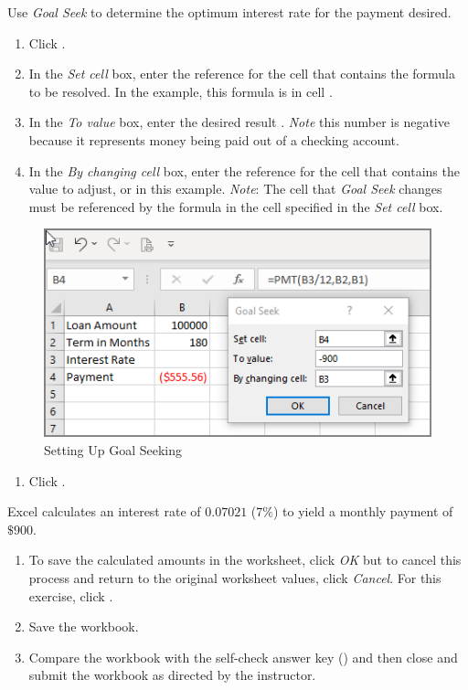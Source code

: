 Use \textit{Goal Seek} to determine the optimum interest rate for the payment desired.

\begin{enumerate}
	\item Click .
	\item In the \textit{Set cell} box, enter the reference for the cell that contains the formula to be resolved. In the example, this formula is in cell .
	\item In the \textit{To value} box, enter the desired result . \textit{Note} this number is negative because it represents money being paid out of a checking account.
	\item In the \textit{By changing cell} box, enter the reference for the cell that contains the value to adjust, or  in this example. \textit{Note}: The cell that \textit{Goal Seek} changes must be referenced by the formula in the cell specified in the \textit{Set cell} box.
	
\end{enumerate}

\begin{figure}[H]
	\centering
	\includegraphics[width=\maxwidth{.95\linewidth}]{gfx/ch08_fig60}
	\caption{Setting Up Goal Seeking}
	\label{08:fig60}
\end{figure}

\begin{enumerate}[resume]	
	\item Click .
\end{enumerate}

Excel calculates an interest rate of $ 0.07021 $ ($ 7\% $) to yield a monthly payment of $ \$900 $. 

\begin{enumerate}[resume]
	\item To save the calculated amounts in the worksheet, click \textit{OK} but to cancel this process and return to the original worksheet values, click \textit{Cancel}. For this exercise, click .
	\item Save the  workbook.
	\item Compare the workbook with the self-check answer key () and then close and submit the  workbook as directed by the instructor.

\end{enumerate}

